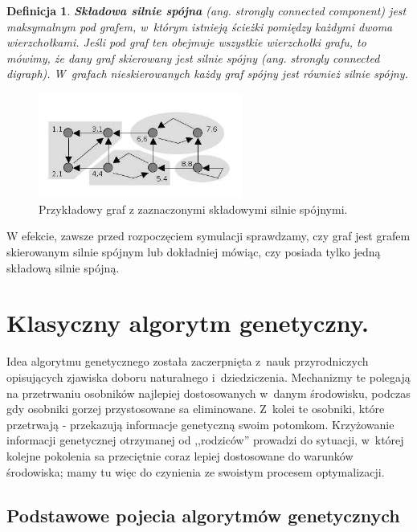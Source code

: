 \documentclass[twoside,12pt]{report}
\newtheorem{definition}{Definicja} %
\begin{document}
\vspace*{15px}

\begin{definition}
\textbf{Składowa silnie spójna} (ang. strongly connected component) jest maksymalnym pod grafem, w~którym istnieją ścieżki pomiędzy każdymi dwoma wierzchołkami. Jeśli pod graf ten obejmuje wszystkie wierzchołki grafu, to mówimy, że dany graf skierowany jest silnie spójny (ang. strongly connected digraph). W~grafach nieskierowanych każdy graf spójny jest również silnie spójny.
\end{definition}

\begin{figure}[ht]
\centering
\includegraphics[width=0.6\textwidth]{img/tajran}
\caption{Przykładowy graf z zaznaczonymi składowymi silnie spójnymi.}
\end{figure}

W efekcie, zawsze przed rozpoczęciem symulacji sprawdzamy, czy graf jest grafem skierowanym silnie spójnym lub dokładniej mówiąc, czy posiada tylko jedną składową silnie spójną.

\section{Klasyczny algorytm genetyczny.}

Idea algorytmu genetycznego została zaczerpnięta z~nauk przyrodniczych opisujących zjawiska doboru naturalnego i~dziedziczenia. Mechanizmy te polegają na
przetrwaniu osobników najlepiej dostosowanych w~danym środowisku, podczas gdy
osobniki gorzej przystosowane sa eliminowane. Z~kolei te osobniki, które przetrwają
- przekazują informacje genetyczną swoim potomkom. Krzyżowanie informacji genetycznej otrzymanej od ,,rodziców'' prowadzi do sytuacji, w~której kolejne pokolenia sa przeciętnie coraz lepiej dostosowane do warunków środowiska; mamy tu więc do czynienia ze swoistym procesem optymalizacji. 

\subsection{Podstawowe pojecia algorytmów genetycznych}
\end{document}
